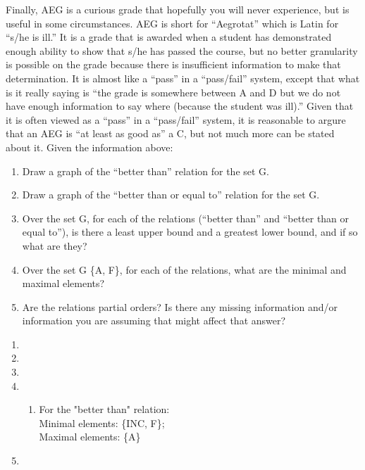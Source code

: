 \documentclass[12pt]{article}
\newenvironment{solution}[2][Solution]{ \begin{trivlist}
\item[\hskip \labelsep {\bfseries #1}]}{\end{trivlist}}
\newenvironment{problem}[2][Problem]{\begin{trivlist}
\item[\hskip \labelsep {\bfseries #1}\hskip \labelsep {\bfseries #2.}]}{\end{trivlist}}
\begin{document}
\begin{problem}{7}
Finally, AEG is a curious grade that hopefully you will never experience, but is useful in some circumstances. AEG is short for “Aegrotat” which is Latin for “s/he is ill.” It is a grade that is awarded when a student has demonstrated enough ability to show that s/he has passed the course, but no better granularity is possible on the grade because there is insufficient information to make that determination. It is almost like a “pass” in a “pass/fail” system, except that what is it really saying is “the grade is somewhere between A and D but we do not have enough information to say where (because the student was ill).” Given that it is often viewed as a “pass” in a “pass/fail” system, it is reasonable to argure that an AEG is “at least as good as” a C, but not much more can be stated about it.
Given the information above:
\item[]
\begin{enumerate}[label=\alph*)]
    \item Draw a graph of the “better than” relation for the set G.
    \item Draw a graph of the “better than or equal to” relation for the set G.
    \item Over the set G, for each of the relations (“better than” and “better than or equal to”), is there a least upper bound and a greatest lower bound, and if so what are they?
    \item Over the set G \textminus  \{A, F\}, for each of the relations, what are the minimal and maximal elements?
    \item Are the relations partial orders? Is there any missing information and/or information you are assuming that might affect that answer?
\end{enumerate}
\end{problem}
\begin{solution}{7}
\item[]
\begin{enumerate}[label=\alph*)]
\item
\item
\item
\item \begin{enumerate}[label=\roman*)]
\item For the "better than" relation: \\Minimal elements: \{INC, F\};\\
Maximal elements: \{A\}
\end{enumerate}
\item
\end{enumerate}
\end{solution}
\pagebreak
\end{document}
